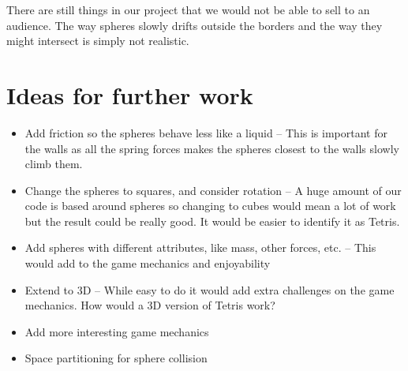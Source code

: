 \documentclass[11pt]{article} %
\begin{document}
There are still things in our project that we would not be able to sell to an audience. The way spheres slowly drifts outside the borders and the way they might intersect is simply not realistic. 

\section{Ideas for further work}
\begin{itemize}
\item{Add friction so the spheres behave less like a liquid -- This is important for the walls as all the spring forces makes the spheres closest to the walls slowly climb them.}
\item{Change the spheres to squares, and consider rotation -- A huge amount of our code is based around spheres so changing to cubes would mean a lot of work but the result could be really good. It would be easier to identify it as Tetris.}
\item{Add spheres with different attributes, like mass, other forces, etc. -- This would add to the game mechanics and enjoyability}
\item{Extend to 3D -- While easy to do it would add extra challenges on the game mechanics. How would a 3D version of Tetris work?}
\item{Add more interesting game mechanics}
\item{Space partitioning for sphere collision}
\end{itemize}
\end{document}
